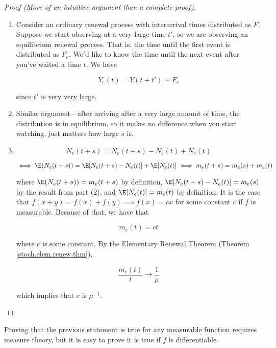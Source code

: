 \begin{proof}[Proof (More of an intuitive argument than a complete proof)]

\begin{enumerate}[(1)]

\item  Consider an ordinary renewal process with interarrival times distributed as \(F\). Suppose we start observing at a very large time \(t'\), so we are observing an equilibrium renewal process. That is, the time until the first event is distributed as \(F_e\). We'd like to know the time until the next event after you've waited a time \(t\). We have

\[
Y_e(t) = Y(t + t') \sim F_e
\]

since \(t'\) is very very large.

\item Similar argument---after arriving after a very large amount of time, the distribution is in equilibrium, so it makes no difference when you start watching, just matters how large \(s\) is.


\item

\[
N_e(t+s) = N_e(t+s) - N_e(t) + N_e(t)
\]

\[
\iff \E(N_e(t+s) )= \E [ N_e(t+s) - N_e(t)] + \E[ N_e(t) ] \iff m_e(t+s) = m_e(s) + m_e(t)
\]

where \( \E(N_e(t+s) ) = m_e(t+s)\) by definition, \(\E [ N_e(t+s) - N_e(t)] =  m_e(s)\) by the result from part (2), and \( \E[ N_e(t) ]  = m_e(t)\) by definition.  It is the case that \(f(x+y) = f(x) + f(y) \implies f(x) = c x\) for some constant \(c\) if \(f\) is measurable. Because of that, we have that 

\[
m_e(t) = ct
\]

where \(c\) is some constant. By the Elementary Renewal Theorem (Theorem \ref{stoch.elem.renew.thm}),

\[
\frac{m_e(t)}{t} \to \frac{1}{\mu}
\]

which implies that \(c\) is \(\mu^{-1}\).

\end{enumerate}

\end{proof}

Proving that the previous statement is true for any measurable function requires measure theory, but it is easy to prove it is true if \(f\) is differentiable. 

